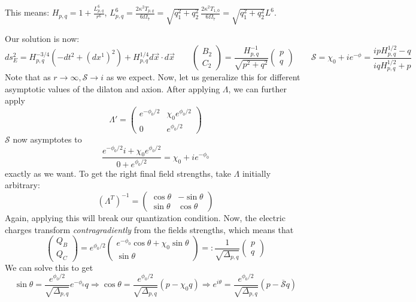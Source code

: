\documentclass[11pt, class=article, crop=false]{standalone}
\begin{document}
\begin{enumerate}
	This means: $H_{p,q} = 1 + \frac{L^6_{p,q}}{r^6}$, $L_{p,q}^6 = \frac{2 \kappa^2 T_{p,q}}{6 \Omega_7} = \sqrt{q_1^2 + q_2^2}\,  \frac{2 \kappa^2 T_{1,0}}{6 \Omega_7} = \sqrt{q_1^2 + q_2^2} L^6$.
	
	Our solution is now:
	\[
		ds^2_E = H_{p,q}^{-3/4} (-dt^2 + (dx^1)^2) + H_{p,q}^{1/4} d\vec x \cdot d \vec x \qquad \begin{pmatrix}
			B_2\\ C_2
		\end{pmatrix} = \frac{H_{p,q}^{-1}}{\sqrt{p^2 + q^2}} \begin{pmatrix}
			p\\q
		\end{pmatrix}\qquad \mathcal S = \chi_0 + i e^{- \phi} = \frac{i p H_{p,q}^{1/2} - q}{i q H_{p,q}^{1/2} + p}
	\]
	Note that as $r \to \infty, \mathcal S \to i$ as we expect. 
	Now, let us generalize this for different asymptotic values of the dilaton and axion. After applying $\Lambda$, we can further apply
	\[
		\Lambda' = \begin{pmatrix}
			e^{-\phi_0 / 2} & \chi_0 e^{\phi_0/2}\\
			0 & e^{\phi_0/2}
		\end{pmatrix}
	\]
	$\mathcal S$ now asymptotes to
	\[
		\frac{e^{-\phi_0/2} i + \chi_0 e^{\phi_0/2}}{0 + e^{\phi_0/2}} = \chi_0 + i e^{-\phi_0}
	\]
	exactly as we want. To get the right final field strengths, take $\Lambda$ initially arbitrary:
	\[
		(\Lambda^T)^{-1} = \begin{pmatrix}
			\cos \theta & -\sin \theta\\
			\sin \theta & \cos \theta
		\end{pmatrix}
	\]
	Again, applying this will break our quantization condition. Now, the electric charges transform \emph{contragradiently} from the fields strengths, which means that
	\[
		\begin{pmatrix}
			Q_B\\
			Q_C
		\end{pmatrix}
		= e^{\phi_0/2} \begin{pmatrix}
			e^{-\phi_0} \cos \theta + \chi_0 \sin \theta\\
			\sin \theta
		\end{pmatrix}  =: \frac{1}{\sqrt{\Delta_{p,q}}} \begin{pmatrix}
			p\\q
		\end{pmatrix}
	\]
	We can solve this to get 
	\[
		\sin \theta = \frac{e^{\phi_0/2}}{\sqrt{\Delta_{p,q}}} e^{-\phi_0} q \Rightarrow \cos \theta = \frac{e^{\phi_0/2}}{\sqrt{\Delta_{p,q}}} (p - \chi_0 q) \Rightarrow e^{i \theta} = \frac{e^{\phi_0/2}}{\sqrt{\Delta_{p,q}}} (p - \overline{\mathcal S} q )
\]
\end{enumerate}
\end{document}
